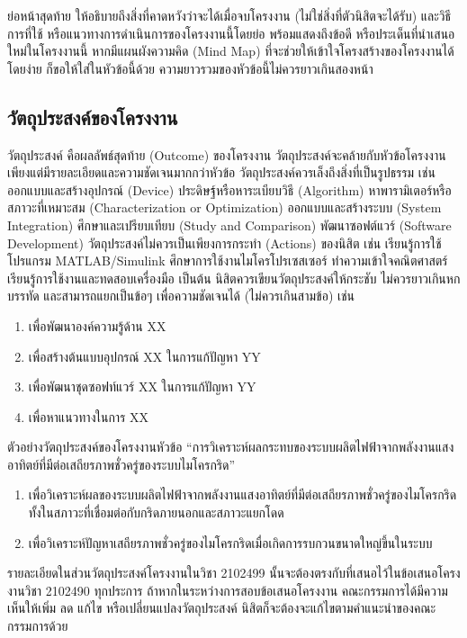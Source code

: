 \documentclass[11pt,a4paper]{article}
\begin{document}
ย่อหน้าสุดท้าย ให้อธิบายถึงสิ่งที่คาดหวังว่าจะได้เมื่อจบโครงงาน (ไม่ใช่สิ่งที่ตัวนิสิตจะได้รับ) และวิธีการที่ใช้ หรือแนวทางการดำเนินการของโครงงานนี้โดยย่อ พร้อมแสดงถึงข้อดี หรือประเด็นที่นำเสนอใหม่ในโครงงานนี้ หากมีแผนผังความคิด (Mind Map) ที่จะช่วยให้เข้าใจโครงสร้างของโครงงานได้โดยง่าย ก็ขอให้ใส่ในหัวข้อนี้ด้วย ความยาวรวมของหัวข้อนี้ไม่ควรยาวเกินสองหน้า

\subsection{วัตถุประสงค์ของโครงงาน}
วัตถุประสงค์ คือผลลัพธ์สุดท้าย (Outcome) ของโครงงาน วัตถุประสงค์จะคล้ายกับหัวข้อโครงงาน เพียงแต่มีรายละเอียดและความชัดเจนมากกว่าหัวข้อ วัตถุประสงค์ควรเล็งถึงสิ่งที่เป็นรูปธรรม เช่น ออกแบบและสร้างอุปกรณ์ (Device) ประดิษฐ์หรือหาระเบียบวิธี (Algorithm) หาพารามิเตอร์หรือสภาวะที่เหมาะสม (Characterization or Optimization) ออกแบบและสร้างระบบ (System Integration) ศึกษาและเปรียบเทียบ (Study and Comparison) พัฒนาซอฟต์แวร์ (Software Development) วัตถุประสงค์ไม่ควรเป็นเพียงการกระทำ (Actions) ของนิสิต เช่น เรียนรู้การใช้โปรแกรม MATLAB/Simulink ศึกษาการใช้งานไมโครโปรเซสเซอร์ ทำความเข้าใจคณิตศาสตร์ เรียนรู้การใช้งานและทดสอบเครื่องมือ เป็นต้น นิสิตควรเขียนวัตถุประสงค์ให้กระชับ ไม่ควรยาวเกินหกบรรทัด และสามารถแยกเป็นข้อๆ เพื่อความชัดเจนได้ (ไม่ควรเกินสามข้อ) เช่น
\begin{enumerate}
    \item เพื่อพัฒนาองค์ความรู้ด้าน XX
    \item เพื่อสร้างต้นแบบอุปกรณ์ XX ในการแก้ปัญหา YY
    \item เพื่อพัฒนาชุดซอฟท์แวร์ XX ในการแก้ปัญหา YY
    \item เพื่อหาแนวทางในการ XX
\end{enumerate}

ตัวอย่างวัตถุประสงค์ของโครงงานหัวข้อ “การวิเคราะห์ผลกระทบของระบบผลิตไฟฟ้าจากพลังงานแสงอาทิตย์ที่มีต่อเสถียรภาพชั่วครู่ของระบบไมโครกริด”
\begin{enumerate}
    \item เพื่อวิเคราะห์ผลของระบบผลิตไฟฟ้าจากพลังงานแสงอาทิตย์ที่มีต่อเสถียรภาพชั่วครู่ของไมโครกริด ทั้งในสภาวะที่เชื่อมต่อกับกริดภายนอกและสภาวะแยกโดด
    \item เพื่อวิเคราะห์ปัญหาเสถียรภาพชั่วครู่ของไมโครกริดเมื่อเกิดการรบกวนขนาดใหญ่ขึ้นในระบบ
\end{enumerate}

รายละเอียดในส่วนวัตถุประสงค์โครงงานในวิชา 2102499 นั้นจะต้องตรงกับที่เสนอไว้ในข้อเสนอโครงงานวิชา 2102490 ทุกประการ ถ้าหากในระหว่างการสอบข้อเสนอโครงงาน คณะกรรมการได้มีความเห็นให้เพิ่ม ลด แก้ไข หรือเปลี่ยนแปลงวัตถุประสงค์ นิสิตก็จะต้องจะแก้ไขตามคำแนะนำของคณะกรรมการด้วย
\end{document}
